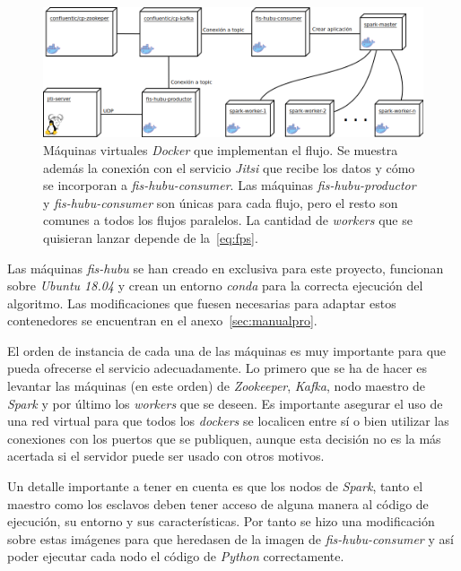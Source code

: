 \begin{figure}
	\centering
	\includegraphics[width=\textwidth]{img/DespliegueDocker.png}
	\caption[Máquinas virtuales \textit{Docker} que implementan el flujo.]{Máquinas virtuales \textit{Docker} que implementan el flujo. Se muestra además la conexión con el servicio \textit{Jitsi} que recibe los datos y cómo se incorporan a \textit{fis-hubu-consumer}. Las máquinas \textit{fis-hubu-productor} y \textit{fis-hubu-consumer} son únicas para cada flujo, pero el resto son comunes a todos los flujos paralelos. La cantidad de \textit{workers} que se quisieran lanzar depende de la~\autoref{eq:fps}.}
	\label{fig:despligueDocker}
\end{figure}

Las máquinas \textit{fis-hubu} se han creado en exclusiva para este proyecto, funcionan sobre \textit{Ubuntu 18.04} y crean un entorno \textit{conda} para la correcta ejecución del algoritmo. Las modificaciones que fuesen necesarias para adaptar estos contenedores se encuentran en el anexo~\ref{sec:manualpro}. 

El orden de instancia de cada una de las máquinas es muy importante para que pueda ofrecerse el servicio adecuadamente. Lo primero que se ha de hacer es levantar las máquinas (en este orden) de \textit{Zookeeper}, \textit{Kafka}, nodo maestro de \textit{Spark} y por último los \textit{workers} que se deseen. Es importante asegurar el uso de una red virtual para que todos los \textit{dockers} se localicen entre sí o bien utilizar las conexiones con los puertos que se publiquen, aunque esta decisión no es la más acertada si el servidor puede ser usado con otros motivos.

Un detalle importante a tener en cuenta es que los nodos de \textit{Spark}, tanto el maestro como los esclavos deben tener acceso de alguna manera al código de ejecución, su entorno y sus características. Por tanto se hizo una modificación sobre estas imágenes para que heredasen de la imagen de \textit{fis-hubu-consumer} y así poder ejecutar cada nodo el código de \textit{Python} correctamente.

